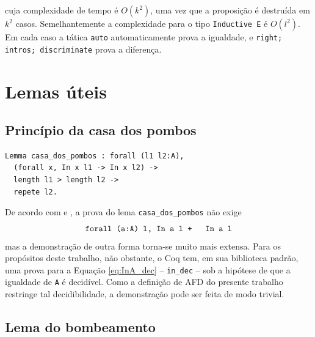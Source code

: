 \noindent
cuja complexidade de tempo é $O(k^2)$, uma vez que a proposição é destruída em $k^2$ casos. Semelhantemente a complexidade para o tipo \texttt{Inductive E} é $O(l^2)$. Em cada caso a tática \texttt{auto} automaticamente prova a igualdade, e \texttt{right; intros; discriminate} prova a diferença.

\section{Lemas úteis}

\subsection{Princípio da casa dos pombos}


\begin{verbatim}
Lemma casa_dos_pombos : forall (l1 l2:A),
  (forall x, In x l1 -> In x l2) ->
  length l1 > length l2 ->
  repete l2.
\end{verbatim}

De acordo com  e , a prova do lema \texttt{casa_dos_pombos} não exige \begin{equation}\label{eq:InA_dec}\text{\texttt{forall (a:A) l, {In a l} + {~ In a l}}}\end{equation} mas a demonstração de outra forma torna-se muito mais extensa. Para os propósitos deste trabalho, não obstante, o Coq tem, em sua biblioteca padrão, uma prova para a Equação \ref{eq:InA_dec} -- \texttt{in_dec} -- sob a hipótese de que a igualdade de \texttt{A} é decidível. Como a definição de AFD do presente trabalho restringe tal decidibilidade, a demonstração pode ser feita de modo trivial.

\subsection{Lema do bombeamento}
